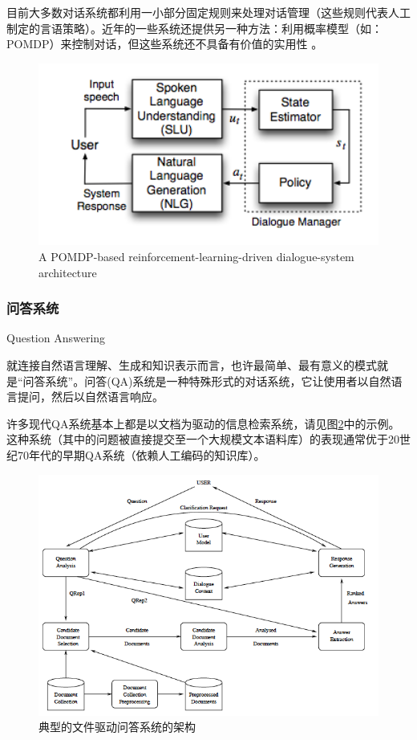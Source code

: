 目前大多数对话系统都利用一小部分固定规则来处理对话管理（这些规则代表人工制定的言语策略）。近年的一些系统还提供另一种方法：利用概率模型（如：POMDP）来控制对话，但这些系统还不具备有价值的实用性\cite{Young2006} \cite{Williams2010}。

\begin{figure}[htb]
\centering
\includegraphics[width=12cm]{figures/pomdp.png}
\caption{ A POMDP-based reinforcement-learning-driven dialogue-system architecture }
\label{fig:dialogue}
\end{figure}



\subsubsection{问答系统}{Question Answering}

就连接自然语言理解、生成和知识表示而言，也许最简单、最有意义的模式就是“问答系统”。问答(QA)系统是一种特殊形式的对话系统，它让使用者以自然语言提问，然后以自然语言响应。


许多现代QA系统基本上都是以文档为驱动的信息检索系统，请见图\ref{fig:qa}中的示例\cite{Hirschman2001}。这种系统（其中的问题被直接提交至一个大规模文本语料库）的表现通常优于20世纪70年代的早期QA系统（依赖人工编码的知识库）。

\begin{figure}[htb]
\centering
\includegraphics[width=12cm]{figures/qa.png}
\caption{典型的文件驱动问答系统的架构}
\label{fig:qa}
\end{figure}

